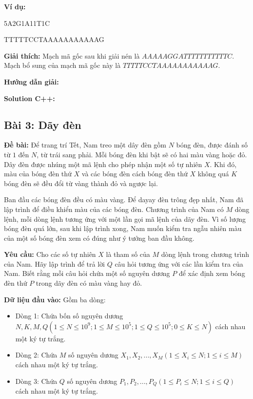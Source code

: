 \documentclass[12pt]{scrartcl}  %
\begin{document}
\textbf{Ví dụ:}
\begin{tcolorbox}[colback=gray!5!white, colframe=blue!50!black, title=Input]
5A2G1A11T1C
\end{tcolorbox}

\begin{tcolorbox}[colback=gray!5!white, colframe=green!50!black, title=Output]
TTTTTCCTAAAAAAAAAAAG
\end{tcolorbox}

\textbf{Giải thích:}
Mạch mã gốc sau khi giải nén là $AAAAAGGATTTTTTTTTTTC$. Mạch bổ sung của mạch mã gốc này là $TTTTTCCTAAAAAAAAAAAG$.

\textbf{Hướng dẫn giải:}

\textbf{Solution C++:}

\subsection{Bài 3: Dãy đèn}

\textbf{Đề bài:}
Để trang trí Tết, Nam treo một dây đèn gồm $N$ bóng đèn, được đánh số từ $1$ đến $N$, từ trái sang phải. Mỗi bóng đèn khi bật sẽ có hai màu vàng hoặc đỏ. Dây đèn được nhúng một mã lệnh 
cho phép nhận một số tự nhiên $X$. Khi đó, màu của bóng đèn thứ $X$ và các bóng đèn cách bóng đèn thứ $X$ không quá $K$ bóng đèn sẽ đều đổi từ vàng thành đỏ và ngược lại.

Ban đầu các bóng đèn đều có màu vàng. Để dayay đèn trông đẹp nhất, Nam đã lập trình để điều khiển màu của các bóng đèn. Chương trình của Nam có $M$ dòng lệnh, mỗi dòng lệnh tương ứng với một lần gọi mã lệnh của dãy đèn. Vì số lượng bóng đèn quá lớn, sau khi lập trình xong, Nam muốn kiểm tra ngẫu nhiên màu của một số bóng đèn xem có đúng như ý tưởng ban đầu không. 

\textbf{Yêu cầu:}
Cho các số tự nhiên $X$ là tham số của $M$ dòng lệnh trong chương trình của Nam. Hãy lập trình để trả lời $Q$ câu hỏi tương ứng với các lần kiểm tra của Nam. Biết rằng mỗi câu hỏi chứa một số nguyên dương $P$ để xác định xem bóng đèn thứ $P$ trong dãy đèn có màu vàng hay đỏ.

\textbf{Dữ liệu đầu vào:}
Gồm ba dòng:
\begin{itemize}
    \item Dòng 1: Chứa bốn số nguyên dương $N, K, M, Q (1 \leq N \leq 10^9; 1 \leq M \leq 10^5; 1 \leq Q \leq 10^5; 0 \leq K \leq N)$ cách nhau một ký tự trắng.
    \item Dòng 2: Chứa $M$ số nguyên dương $X_1, X_2, ... , X_M (1 \leq X_i \leq N; 1 \leq i \leq M)$ cách nhau một ký tự trắng.
    \item Dòng 3: Chứa $Q$ số nguyên dương $P_1, P_2, ... , P_Q (1 \leq P_i \leq N; 1 \leq i \leq Q)$ cách nhau một ký tự trắng.
\end{itemize}
\end{document}
